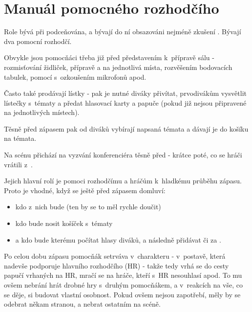 \needspace{5cm} \section{Manuál pomocného rozhodčího} \label{manuál pomocného rozhodčího} Role  bývá při  podceňována, a bývají do ní obsazováni nejméně zkušení . Bývají dva pomocní rozhodčí. 
 
Obvykle jsou pomocňáci třeba již před představením  k~přípravě sálu  - rozmisťování židliček, přípravě  a  na jednotlivá místa, 
rozvěšením bodovacích tabulek, pomocí  s~ozkoušením mikrofonů apod. 
 
Často také prodávají lístky - pak je nutné diváky přivítat, prvodivákům vysvětlit lístečky s~tématy a předat hlasovací karty a papuče (pokud již nejsou připravené na jednotlivých místech). 
 
Těsně před zápasem pak od diváků vybírají napsaná témata a dávají je do košíku na témata. 
 
Na scénu přichází na vyzvání konferenciéra těsně před  - krátce poté, co se hráči vrátili z~. 
 
Jejich hlavní rolí je pomoci rozhodčímu a hráčům k~hladkému průběhu zápasu. Proto je vhodné, když se ještě před zápasem domluví: 
\begin{itemize}
\item  kdo z~nich bude   (ten by se to měl rychle doučit)
\item  kdo bude nosit košíček s~tématy
\item  a kdo bude kterému  počítat hlasy diváků, a následně přidávat  či  za .
\end{itemize}
 
Po celou dobu zápasu pomocňák setrváva v~charakteru - v~postavě, která nadevše podporuje hlavního rozhodčího (HR) - takže tedy vrhá se do cesty papučí vrhaných na HR, mračí se na hráče, kteří s~HR nesouhlasí apod. To mu ovšem nebrání hrát drobné  hry s~druhým pomocňákem, a v~reakcích na vše, co se děje, si budovat vlastní osobnost. Pokud ovšem nejsou zapotřebí, měly by se odebrat někam stranou, a nebrat  ostatním na scéně. 
 
